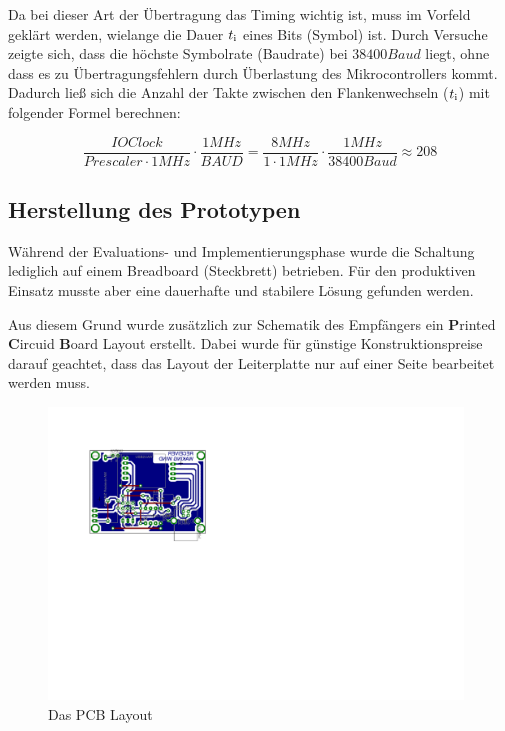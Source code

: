 \documentclass{report}
\begin{document}
Da bei dieser Art der Übertragung das Timing wichtig ist, muss im Vorfeld geklärt werden, wielange die Dauer $t\textsubscript{i}$ eines Bits (Symbol) ist. Durch Versuche zeigte sich, dass die höchste Symbolrate (Baudrate) bei $38400 Baud$ liegt, ohne dass es zu Übertragungsfehlern durch Überlastung des Mikrocontrollers kommt. Dadurch ließ sich die Anzahl der Takte zwischen den Flankenwechseln ($t\textsubscript{i}$) mit folgender Formel berechnen:

\begin{equation*}
    \frac{IO Clock}{Prescaler \cdot 1MHz} \cdot \frac{1MHz}{BAUD} = \frac{8MHz}{1 \cdot 1MHz} \cdot \frac{1MHz}{38400 Baud} \approx 208
\end{equation*}

\subsection{Herstellung des Prototypen}
Während der Evaluations- und Implementierungsphase wurde die Schaltung lediglich auf einem Breadboard (Steckbrett) betrieben. Für den produktiven Einsatz musste aber eine dauerhafte und stabilere Lösung gefunden werden.

Aus diesem Grund wurde zusätzlich zur Schematik des Empfängers ein \textbf{P}rinted \textbf{C}ircuid \textbf{B}oard Layout erstellt. Dabei wurde für günstige Konstruktionspreise darauf geachtet, dass das Layout der Leiterplatte nur auf einer Seite bearbeitet werden muss.

\begin{figure}[!htb]
    \begin{center}
        \includegraphics[width=11cm]{Bilder/board.pdf}
    \end{center}
    \caption{Das PCB Layout}
    \label{board}
\end{figure}
\end{document}
